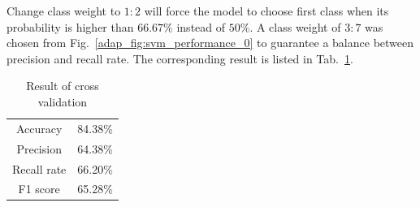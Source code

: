 Change class weight to $1:2$ will force the model to choose first class when its probability is higher than $66.67\%$ instead of $50\%$.
A class weight of $3:7$ was chosen from Fig.~\ref{adap_fig:svm_performance_0} to guarantee a balance between precision and recall rate.
The corresponding result is listed in Tab.~\ref{adap_tab:svm_result}.
\begin{table}[h!]
    \centering
    \caption{Result of cross validation}
    \begin{tabular}{cc}
        \toprule
        Accuracy    &   84.38\%    \\
        Precision   &   64.38\%     \\
        Recall rate &   66.20\%     \\
        F1 score    &   65.28\%     \\
        \bottomrule
    \end{tabular}
    \label{adap_tab:svm_result}
\end{table}

